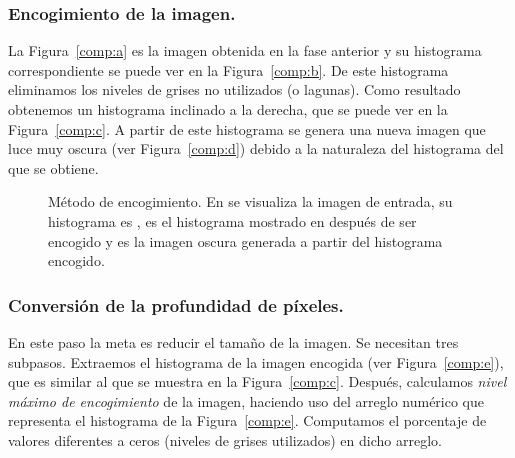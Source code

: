 \subsubsection{Encogimiento de la imagen.} 

La Figura~\ref{comp:a} es la imagen obtenida en la fase anterior y su
histograma correspondiente se puede ver en la Figura~\ref{comp:b}. De este
histograma eliminamos los niveles de grises no utilizados (o lagunas). Como
resultado obtenemos un histograma inclinado a la derecha, que se puede ver en
la Figura~\ref{comp:c}. A partir de este histograma se genera una nueva imagen
que luce muy oscura (ver Figura~\ref{comp:d}) debido a la naturaleza del
histograma del que se obtiene.

\begin{figure}[h]
  \begin{center}
    \hspace{12pt}

    \bigskip

    \hspace{12pt}
  \end{center}

  \caption[Método de encogimiento]{Método de encogimiento. En
  \protect{} se visualiza la imagen de entrada, su histograma es
  \protect{}, \protect{} es el histograma  mostrado
  en \protect{} después de ser encogido y \protect{}
  es la imagen oscura generada a partir del histograma encogido.}
  
  \label{img:shrinking-one}
\end{figure}

\subsubsection{Conversión de la profundidad de píxeles.} 

En este paso la meta es reducir el tamaño de la imagen. Se necesitan tres
subpasos. Extraemos el histograma de la imagen encogida (ver
Figura~\ref{comp:e}), que es similar al que se muestra en la
Figura~\ref{comp:c}. Después, calculamos \textit{nivel máximo de encogimiento}
de la imagen, haciendo uso del arreglo numérico que representa el histograma de
la Figura~\ref{comp:e}. Computamos el porcentaje de valores diferentes a ceros
(niveles de grises utilizados) en dicho arreglo. 


